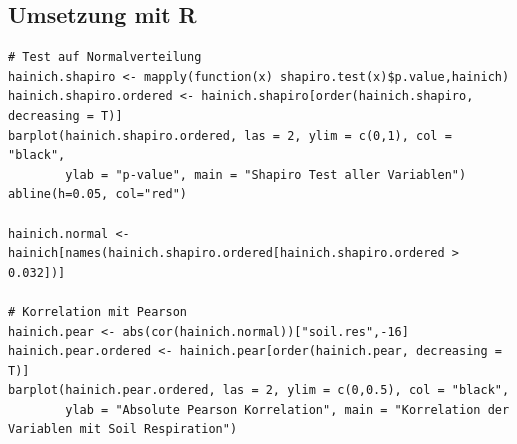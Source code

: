 \subsection{Umsetzung mit R}

\begin{lstlisting}
# Test auf Normalverteilung
hainich.shapiro <- mapply(function(x) shapiro.test(x)$p.value,hainich)
hainich.shapiro.ordered <- hainich.shapiro[order(hainich.shapiro, decreasing = T)]
barplot(hainich.shapiro.ordered, las = 2, ylim = c(0,1), col = "black",
        ylab = "p-value", main = "Shapiro Test aller Variablen")
abline(h=0.05, col="red")

hainich.normal <- hainich[names(hainich.shapiro.ordered[hainich.shapiro.ordered > 0.032])]

# Korrelation mit Pearson
hainich.pear <- abs(cor(hainich.normal))["soil.res",-16]
hainich.pear.ordered <- hainich.pear[order(hainich.pear, decreasing = T)]
barplot(hainich.pear.ordered, las = 2, ylim = c(0,0.5), col = "black",
        ylab = "Absolute Pearson Korrelation", main = "Korrelation der Variablen mit Soil Respiration")
\end{lstlisting}
